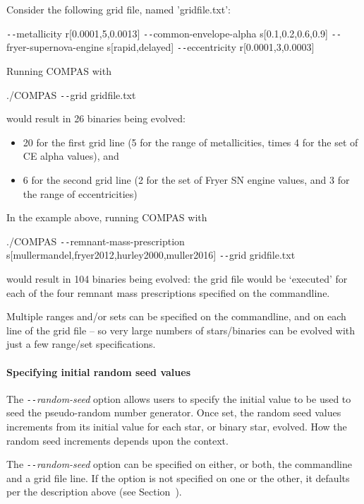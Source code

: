 \bigskip
Consider the following grid file, named 'gridfile.txt':

\tabto{3em}\texttt{-{}-}metallicity r[0.0001,5,0.0013] \texttt{-{}-}common-envelope-alpha s[0.1,0.2,0.6,0.9]
\tabto{3em}\texttt{-{}-}fryer-supernova-engine s[rapid,delayed] \texttt{-{}-}eccentricity r[0.0001,3,0.0003]

\bigskip
Running COMPAS with

\tabto{3em}./COMPAS \texttt{-{}-}grid gridfile.txt

\bigskip
would result in 26 binaries being evolved:
\begin{itemize}
\item 20 for the first grid line (5 for the range of metallicities, times 4 for the set of CE alpha values), and
\item 6 for the second grid line (2 for the set of Fryer SN engine values, and 3 for the range of eccentricities)
\end{itemize}

\bigskip
In the example above, running COMPAS with

\small
\tabto{2.5em}./COMPAS \texttt{-{}-}remnant-mass-prescription s[mullermandel,fryer2012,hurley2000,muller2016] \texttt{-{}-}grid gridfile.txt
\normalsize

\bigskip
would result in 104 binaries being evolved: the grid file would be ‘executed’ for each of the four remnant mass prescriptions specified on the commandline.

Multiple ranges and/or sets can be specified on the commandline, and on each line of the grid file – so very large numbers of stars/binaries can be evolved with just a few range/set specifications.

\paragraph{Specifying initial random seed values}\label{sec:RandomSeed}\mbox{}

The \textit{\texttt{-{}-}random-seed} option allows users to specify the initial value to be used to seed the pseudo-random number generator. Once set, the random seed values increments from its initial value for each star, or binary star, evolved. How the random seed increments depends upon the context.

The \textit{\texttt{-{}-}random-seed} option can be specified on either, or both, the commandline and a grid file line. If the option is not specified on one or the other, it defaults per the description above (see Section~).

